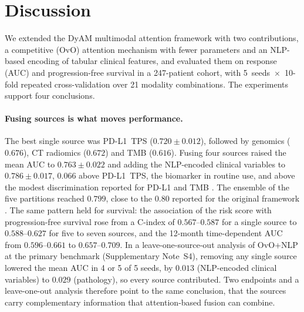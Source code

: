 \section{Discussion}
\label{sec:discussion}

We extended the DyAM multimodal attention framework with two contributions, a competitive (OvO) attention mechanism with fewer
parameters and an NLP-based encoding of tabular clinical features, and evaluated them on response (AUC) and progression-free survival in a
247-patient cohort, with 5~seeds~$\times$~10-fold repeated cross-validation over 21 modality combinations.
The experiments support four conclusions.

\paragraph{Fusing sources is what moves performance.}
The best single source was PD-L1~TPS ($0.720 \pm 0.012$), followed by genomics ($0.676$), CT radiomics ($0.672$) and TMB ($0.616$).
Fusing four sources raised the mean AUC to $0.763 \pm 0.022$ and adding the NLP-encoded clinical variables to $0.786 \pm 0.017$,
$0.066$ above PD-L1~TPS, the biomarker in routine use, and above the modest discrimination reported for PD-L1 and TMB
\cite{Lu2019,Rizvi2015}. The ensemble of the five partitions reached $0.799$, close to the $0.80$ reported for the original framework
\cite{Vanguri2022}.
The same pattern held for survival: the association of the risk score with progression-free survival rose from a C-index of
$0.567$--$0.587$ for a single source to $0.588$--$0.627$ for five to seven sources, and the 12-month time-dependent AUC from
$0.596$--$0.661$ to $0.657$--$0.709$. In a leave-one-source-out analysis of OvO+NLP at the primary benchmark (Supplementary Note~S4),
removing any single source lowered the mean AUC in 4 or 5 of 5 seeds, by $0.013$ (NLP-encoded clinical variables) to $0.029$ (pathology),
so every source contributed. Two endpoints and a leave-one-out analysis therefore point to the same conclusion, that the sources carry
complementary information that attention-based fusion can combine.

